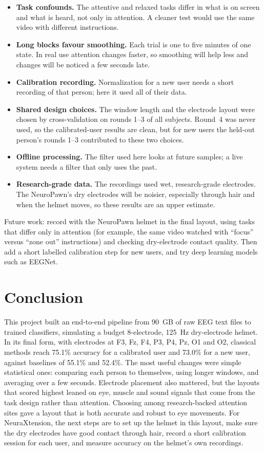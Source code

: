 \documentclass[12pt]{article}
\begin{document}
\begin{itemize}
    \item \textbf{Task confounds.} The attentive and relaxed tasks differ in what is on screen and what is heard, not only in attention. A cleaner test would use the same video with different instructions.
    \item \textbf{Long blocks favour smoothing.} Each trial is one to five minutes of one state. In real use attention changes faster, so smoothing will help less and changes will be noticed a few seconds late.
    \item \textbf{Calibration recording.} Normalization for a new user needs a short recording of that person; here it used all of their data.
    \item \textbf{Shared design choices.} The window length and the electrode layout were chosen by cross-validation on rounds 1--3 of all subjects. Round~4 was never used, so the calibrated-user results are clean, but for new users the held-out person's rounds 1--3 contributed to these two choices.
    \item \textbf{Offline processing.} The filter used here looks at future samples; a live system needs a filter that only uses the past.
    \item \textbf{Research-grade data.} The recordings used wet, research-grade electrodes. The NeuroPawn's dry electrodes will be noisier, especially through hair and when the helmet moves, so these results are an upper estimate.
\end{itemize}

Future work: record with the NeuroPawn helmet in the final layout, using tasks that differ only in attention (for example, the same video watched with ``focus'' versus ``zone out'' instructions) and checking dry-electrode contact quality. Then add a short labelled calibration step for new users, and try deep learning models such as EEGNet.

\section{Conclusion}

This project built an end-to-end pipeline from 90~GB of raw EEG text files to trained classifiers, simulating a budget 8-electrode, 125~Hz dry-electrode helmet. In its final form, with electrodes at F3, Fz, F4, P3, P4, Pz, O1 and O2, classical methods reach 75.1\% accuracy for a calibrated user and 73.0\% for a new user, against baselines of 55.1\% and 52.4\%. The most useful changes were simple statistical ones: comparing each person to themselves, using longer windows, and averaging over a few seconds. Electrode placement also mattered, but the layouts that scored highest leaned on eye, muscle and sound signals that come from the task design rather than attention. Choosing among research-backed attention sites gave a layout that is both accurate and robust to eye movements. For NeuraXtension, the next steps are to set up the helmet in this layout, make sure the dry electrodes have good contact through hair, record a short calibration session for each user, and measure accuracy on the helmet's own recordings.
\end{document}
